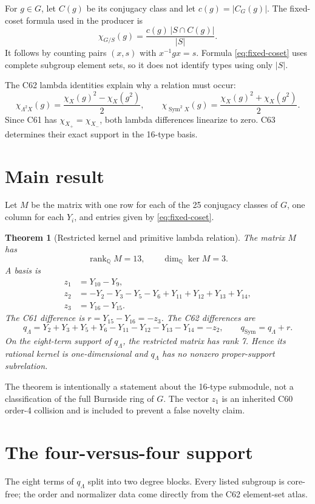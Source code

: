 \documentclass[11pt]{article}
\newtheorem{theorem}{Theorem}
\newcommand{\G}{G}
\newcommand{\Q}{\mathbb{Q}}
\newcommand{\Sym}{\operatorname{Sym}}
\begin{document}
For \(g\in\G\), let \(C(g)\) be its conjugacy class and let
\(c(g)=|C_\G(g)|\).  The fixed-coset formula used in the producer is
\begin{equation}
 \chi_{\G/S}(g)=\frac{c(g)\,|S\cap C(g)|}{|S|}.
 \label{eq:fixed-coset}
\end{equation}
It follows by counting pairs \((x,s)\) with \(x^{-1}gx=s\).  Formula
\eqref{eq:fixed-coset} uses complete subgroup element sets, so it does not
identify types using only \(|S|\).

The C62 lambda identities explain why a relation must occur:
\[
 \chi_{\Lambda^2X}(g)=\frac{\chi_X(g)^2-\chi_X(g^2)}2,
 \qquad
 \chi_{\Sym^2X}(g)=\frac{\chi_X(g)^2+\chi_X(g^2)}2.
\]
Since C61 has \(\chi_{X_+}=\chi_{X_-}\), both lambda differences
linearize to zero.  C63 determines their exact support in the 16-type basis.

\section{Main result}
Let \(M\) be the matrix with one row for each of the 25 conjugacy classes of
\(\G\), one column for each \(Y_i\), and entries given by
\eqref{eq:fixed-coset}.

\begin{theorem}[Restricted kernel and primitive lambda relation]
The matrix \(M\) has
\[
 \operatorname{rank}_{\Q} M=13,
 \qquad \dim_{\Q}\ker M=3.
\]
A basis is
\begin{align*}
 z_1&=Y_{10}-Y_9,\\
 z_2&=-Y_2-Y_3-Y_5-Y_6+Y_{11}+Y_{12}+Y_{13}+Y_{14},\\
 z_3&=Y_{16}-Y_{15}.
\end{align*}
The C61 difference is \(r=Y_{15}-Y_{16}=-z_3\).  The C62 differences are
\[
 q_{\Lambda}=Y_2+Y_3+Y_5+Y_6-Y_{11}-Y_{12}-Y_{13}-Y_{14}=-z_2,
 \qquad q_{\Sym}=q_{\Lambda}+r.
\]
On the eight-term support of \(q_{\Lambda}\), the restricted matrix has rank
7.  Hence its rational kernel is one-dimensional and \(q_{\Lambda}\) has no
nonzero proper-support subrelation.
\end{theorem}

The theorem is intentionally a statement about the 16-type submodule, not a
classification of the full Burnside ring of \(\G\).  The vector \(z_1\) is an
inherited C60 order-4 collision and is included to prevent a false novelty
claim.

\section{The four-versus-four support}
The eight terms of \(q_\Lambda\) split into two degree blocks.  Every listed
subgroup is core-free; the order and normalizer data come directly from the
C62 element-set atlas.
\end{document}
